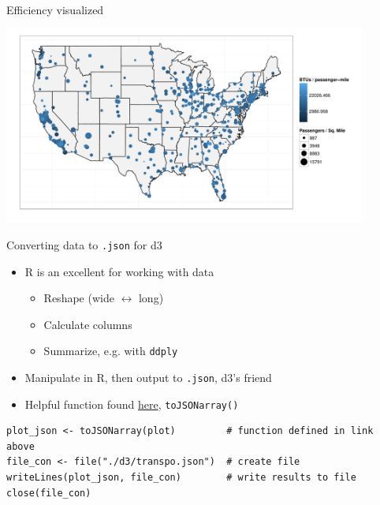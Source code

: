 \documentclass[sans,aspectratio=169,presentation,bigger,fleqn]{beamer}
\begin{document}
\begin{frame}[label=sec-30]{Efficiency visualized}
\begin{center}
\includegraphics[height=6.5cm]{./plots/transpo-plot.pdf}
\end{center}

\normalsize
\end{frame}
\begin{frame}[fragile,label=sec-31]{Converting data to \texttt{.json} for d3}
 \begin{itemize}
\item R is an excellent for working with data
\begin{itemize}
\item Reshape (wide \(\leftrightarrow\) long)
\item Calculate columns
\item Summarize, e.g. with \texttt{ddply}
\end{itemize}
\item Manipulate in R, then output to \texttt{.json}, d3's friend
\item Helpful function found \href{http://theweiluo.wordpress.com/2011/09/30/r-to-json-for-d3-js-and-protovis/}{here}, \texttt{toJSONarray()}
\end{itemize}

\scriptsize
\begin{verbatim}
plot_json <- toJSONarray(plot)         # function defined in link above
file_con <- file("./d3/transpo.json")  # create file
writeLines(plot_json, file_con)        # write results to file
close(file_con)
\end{verbatim}
\normalsize
\end{frame}
\end{document}
